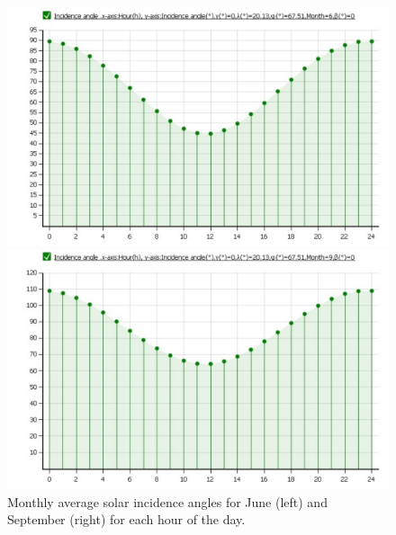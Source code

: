 \begin{figure}[H]
\centering
\begin{minipage}[t]{0.48\linewidth}
\includegraphics[width=\textwidth]{figures/fig_CDR_EPS_SolarIncidenceAngle_Jun}
\end{minipage}
\begin{minipage}[t]{0.48\linewidth}
\centering
\includegraphics[width=\textwidth]{figures/fig_CDR_EPS_SolarIncidenceAngle_Sep}
\end{minipage}
\caption[Solar incidence angles]{Monthly average solar incidence angles for June (left) and September (right) for each hour of the day.}
\label{fig:SolarIncidenceAngles}
\end{figure}
%
